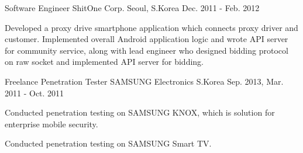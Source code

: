 \documentclass[11pt, a4paper]{../awesome-cv}
\begin{document}
\begin{cventries}
\cventry
    {Software Engineer} {ShitOne Corp.} {Seoul, S.Korea} {Dec. 2011 - Feb. 2012} {
      \begin{cvitems} \item {Developed a proxy drive smartphone application which connects proxy driver and customer. Implemented overall Android application logic and wrote API server for community service, along with lead engineer who designed bidding protocol on raw socket and implemented API server for bidding.}
      \end{cvitems}
    }

\cventry
    {Freelance Penetration Tester} {SAMSUNG Electronics} {S.Korea} {Sep. 2013, Mar. 2011 - Oct. 2011} {
      \begin{cvitems} \item {Conducted penetration testing on SAMSUNG KNOX, which is solution for enterprise mobile security.}
        \item {Conducted penetration testing on SAMSUNG Smart TV.}
      \end{cvitems}
}

\end{cventries}
\end{document}

